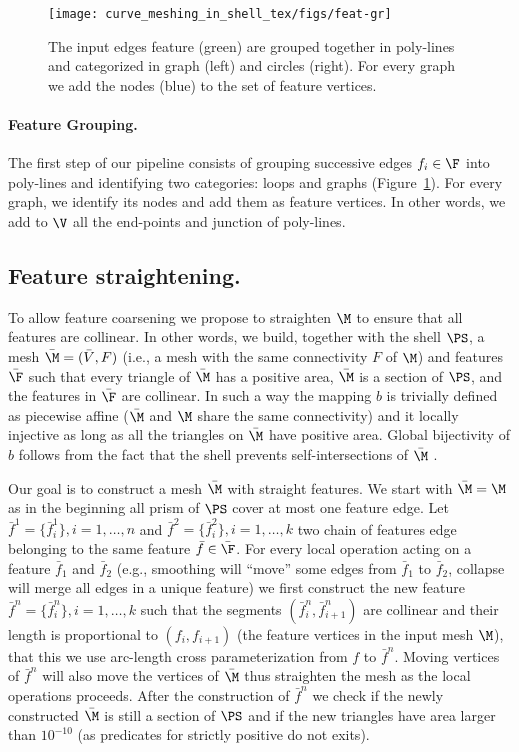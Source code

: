 \begin{figure}
    \centering
    \texttt{[image: curve\_meshing\_in\_shell\_tex/figs/feat-gr]}
    \caption{The input edges feature (green) are grouped together in poly-lines and categorized in graph (left) and circles (right). For every graph we add the nodes (blue) to the set of feature vertices.}
    \label{bichon:fig:feat-gr}
\end{figure}

\paragraph{Feature Grouping.}
The first step of our pipeline consists of grouping successive edges $f_i\in\F$ into poly-lines and identifying two categories: loops and graphs (Figure~\ref{bichon:fig:feat-gr}). For every graph, we identify its nodes and add them as feature vertices. In other words, we add to $\V$ all the end-points and junction of poly-lines.



\subsection{Feature straightening.}\label{sec:snapping}
To allow feature coarsening we propose to straighten $\M$ to ensure that all features are collinear. In other words, we build, together with the shell $\PS$, a mesh $\bar\M = (\bar V,F)$ (i.e., a mesh with the same connectivity $F$ of $\M$) and features $\bar \F$ such that every triangle of $\bar \M$ has a positive area, $\bar \M$ is a section of $\PS$, and the features in $\bar\F$ are collinear. In such a way the mapping $b$ is trivially defined as piecewise affine ($\bar\M$ and $\M$ share the same connectivity) and it locally injective as long as all the triangles on $\bar\M$ have positive area. Global bijectivity of $b$ follows from the fact that the shell prevents self-intersections of $\bar\M$ .


Our goal is to construct a mesh $\bar\M$ with straight features. We start with $\bar\M = \M$ as in the beginning all prism of $\PS$ cover at most one feature edge. Let $\bar f^1 = \{\bar f_i^1\}, i=1,\dots,n$ and $\bar f^2 = \{\bar f_i^2\}, i=1,\dots,k$ two chain of features edge belonging to the same feature $\bar f \in \bar\F$.
For every local operation acting on a feature $\bar f_1$ and $\bar f_2$ (e.g., smoothing will ``move'' some edges from $\bar f_1$ to $\bar f_2$, collapse will merge all edges in a unique feature) we first construct the new feature $\bar f^n = \{\bar f_i^n\}, i=1,\dots,k$ such that the segments $(\bar f_i^n, \bar f_{i+1}^n)$ are collinear and their length is proportional to $( f_i, f_{i+1})$ (the feature vertices in the input mesh $\M$), that this we use arc-length cross parameterization from $f$ to $\bar f^n$. Moving vertices of $\bar f^n$ will also move the vertices of $\bar\M$ thus straighten the mesh as the local operations proceeds. After the construction of $\bar f^n$ we check if the newly constructed $\bar\M$ is still a section of $\PS$ and if the new triangles have area larger than $10^{-10}$ (as predicates for strictly positive do not exits).


